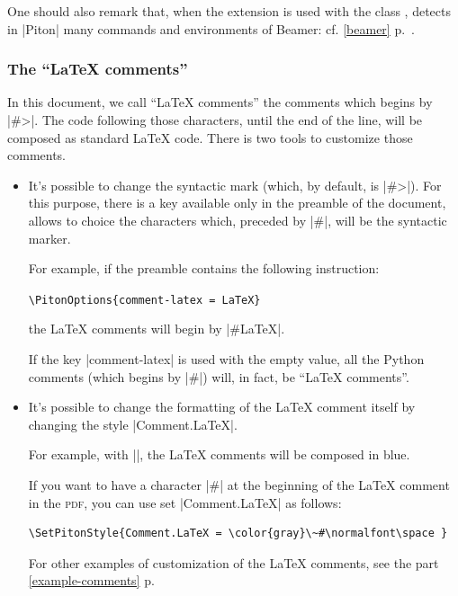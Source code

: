 \documentclass{article}
\begin{document}
One should also remark that, when the extension  is used with the
class ,  detects in |{Piton}| many commands and
environments of Beamer: cf. \ref{beamer} p.~\pageref{beamer}.

\subsubsection{The ``LaTeX comments''}


In this document, we call ``LaTeX comments'' the comments which begins by
|#>|. The code following those characters, until the end of the line, will be
composed as standard LaTeX code. There is two tools to customize those
comments.

\begin{itemize}
\item It's possible to change the syntactic mark (which, by default, is |#>|).
For this purpose, there is a key  available only in
the preamble of the document, allows to choice the characters which, preceded
by |#|, will be the syntactic marker.

For example, if the preamble contains the following instruction:

\quad \verb|\PitonOptions{comment-latex = LaTeX}|

the LaTeX comments will begin by |#LaTeX|.

If the key |comment-latex| is used with the empty value, all the Python
comments (which begins by |#|) will, in fact, be ``LaTeX comments''.

\smallskip
\item It's possible to change the formatting of the LaTeX comment itself by
changing the  style |Comment.LaTeX|.

For example, with ||,
the LaTeX comments will be composed in blue.

If you want to have a character |#| at the beginning of the LaTeX comment in
the \textsc{pdf}, you can use set |Comment.LaTeX| as follows:

\begin{Verbatim}
\SetPitonStyle{Comment.LaTeX = \color{gray}\~#\normalfont\space }
\end{Verbatim}

For other examples of customization of the LaTeX comments, see the part
\ref{example-comments} p.~\pageref{example-comments}
\end{itemize}
\end{document}
